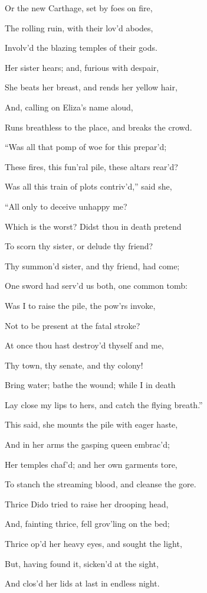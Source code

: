 Or the new Carthage, set by foes on fire,

The rolling ruin, with their lov’d abodes,

Involv’d the blazing temples of their gods.

Her sister hears; and, furious with despair,

She beats her breast, and rends her yellow hair,

And, calling on Eliza’s name aloud,

Runs breathless to the place, and breaks the crowd.

“Was all that pomp of woe for this prepar’d;

These fires, this fun’ral pile, these altars rear’d?

Was all this train of plots contriv’d,” said she,

“All only to deceive unhappy me?

Which is the worst? Didst thou in death pretend

To scorn thy sister, or delude thy friend?

Thy summon’d sister, and thy friend, had come;

One sword had serv’d us both, one common tomb:

Was I to raise the pile, the pow’rs invoke,

Not to be present at the fatal stroke?

At once thou hast destroy’d thyself and me,

Thy town, thy senate, and thy colony!

Bring water; bathe the wound; while I in death

Lay close my lips to hers, and catch the flying breath.”

This said, she mounts the pile with eager haste,

And in her arms the gasping queen embrac’d;

Her temples chaf’d; and her own garments tore,

To stanch the streaming blood, and cleanse the gore.

Thrice Dido tried to raise her drooping head,

And, fainting thrice, fell grov’ling on the bed;

Thrice op’d her heavy eyes, and sought the light,

But, having found it, sicken’d at the sight,

And clos’d her lids at last in endless night.

